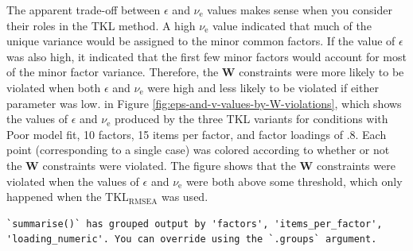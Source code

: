 \documentclass[11pt]{umnthesis}
\begin{document}
The apparent trade-off between \(\epsilon\) and \(\nu_{\textrm{e}}\) values makes sense when you consider their roles in the TKL method. A high \(\nu_{\textrm{e}}\) value indicated that much of the unique variance would be assigned to the minor common factors. If the value of \(\epsilon\) was also high, it indicated that the first few minor factors would account for most of the minor factor variance. Therefore, the \(\mathbf{W}\) constraints were more likely to be violated when both \(\epsilon\) and \(\nu_{\textrm{e}}\) were high and less likely to be violated if either parameter was low. in Figure \ref{fig:eps-and-v-values-by-W-violations}, which shows the values of \(\epsilon\) and \(\nu_{\textrm{e}}\) produced by the three TKL variants for conditions with Poor model fit, 10 factors, 15 items per factor, and factor loadings of .8. Each point (corresponding to a single case) was colored according to whether or not the \(\mathbf{W}\) constraints were violated. The figure shows that the \(\mathbf{W}\) constraints were violated when the values of \(\epsilon\) and \(\nu_{\textrm{e}}\) were both above some threshold, which only happened when the \(\textrm{TKL}_\textrm{RMSEA}\) was used.



\begin{verbatim}
`summarise()` has grouped output by 'factors', 'items_per_factor',
'loading_numeric'. You can override using the `.groups` argument.
\end{verbatim}
\end{document}
